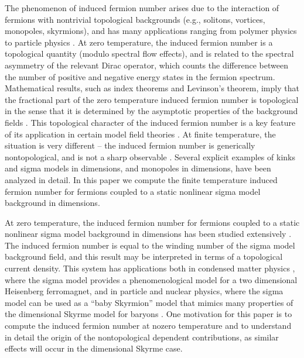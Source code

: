 \documentclass[a4paper,prd]{revtex4}
\begin{document}
The phenomenon of induced fermion number arises due to the interaction of
fermions with nontrivial topological backgrounds (e.g., solitons, vortices,
monopoles, skyrmions), and has many applications ranging from polymer physics
to particle physics \cite{jr,gw,bag,jackiw2,rajaraman,niemi,polymer,amo}.
At zero temperature, the induced fermion number is a topological quantity
(modulo spectral flow effects), and is related to the spectral asymmetry
of the relevant Dirac operator, which counts the difference between the
number of positive and negative energy states in the fermion spectrum.
Mathematical results, such as index theorems and Levinson's theorem,
imply that the fractional part of the zero temperature induced fermion 
number is topological in the sense that it is determined by the
asymptotic properties of the background fields
\cite{rich,wilczek,boy,mike,poly,jaffe2}. This topological character of the induced
fermion number is a key feature of its application in certain model field theories
\cite{eric,weigel,manu,diakonov}. At finite  temperature, the situation is very different -- the
induced fermion number is  generically nontopological, and is not a sharp observable
\cite{ad,dr,leipzig}. Several explicit examples of kinks \cite{ns,soni,keil} and sigma
models \cite{ad,dr} in \coordHE{} dimensions, and monopoles \cite{cp,goldhaber,monopole,ad}
in \coordHE{} dimensions, have been analyzed in detail. In this paper we compute the
finite  temperature induced fermion number for fermions coupled to a static nonlinear
sigma model background in \coordHE{} dimensions. 

At zero temperature, the induced fermion number for fermions coupled
to a static nonlinear sigma  model background in \coordHE{} dimensions has
been studied extensively
\cite{jaro1,carena,aw,abanov}. The \coordHE{} induced fermion number is equal to the
winding number of the sigma model background field, and this result may be
interpreted in terms of a topological current density. This system has applications
both in condensed matter physics \cite{wilczekzee,aw}, where the sigma model
provides a phenomenological model for a two dimensional Heisenberg ferromagnet, and
in particle and nuclear physics, where the sigma model can be used as a ``baby
Skyrmion'' model \cite{jaro1,carena,jaro2,krishna} that mimics many
properties of the \coordHE{} dimensional Skyrme model for baryons
\cite{weigel}. One motivation for this paper
is to compute the induced fermion number at nozero temperature and to
understand in detail the origin of the nontopological \coordHE{} dependent
contributions, as similar effects will occur in the \coordHE{} dimensional
Skyrme case.
\end{document}
